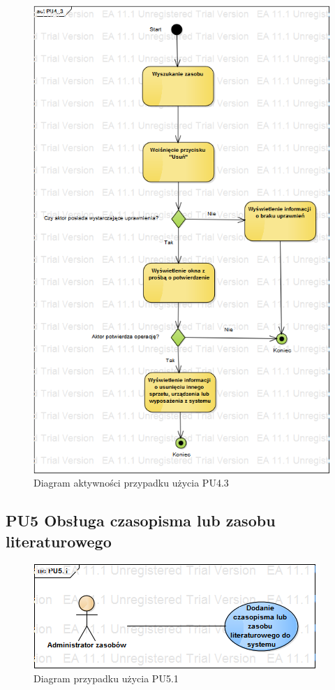 \begin{figure}[h!]
	\centering
	\includegraphics[scale=0.6]{img/diagrams/activityDiagrams/PU4_3}
	\caption{Diagram aktywności przypadku użycia PU4.3 \label{fig:labelADPU4.3}}
\end{figure}

\subsection{PU5 Obsługa czasopisma lub zasobu literaturowego} \label{pu5}

\begin{figure}[h!]
	\centering
	\includegraphics[scale=0.6]{img/diagrams/useCaseDiagrams/PU5_1.png}
	\caption{Diagram przypadku użycia PU5.1 \label{fig:labelUCPU5.1}}
\end{figure}

